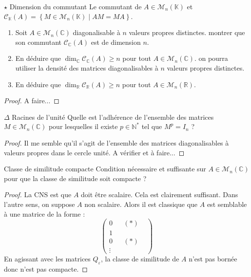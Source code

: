 \documentclass[french,a4paper]{article}
\newcommand{\N}{\mathbb{N}}
\newcommand{\R}{\mathbb{R}}
\newcommand{\C}{\mathbb{C}}
\newcommand{\K}{\mathbb{K}}
\newcommand{\st}{^*}
\theoremstyle{plain}
\theoremstyle{definition}
\theoremstyle{remark}
\begin{document}
\begin{ex}[Moulin.57]{$\star$ Dimension du commutant}
	Le commutant de $A\in\mathcal{M}_n(\K)$ et $\mathcal{C}_\K(A)=\left\{M\in\mathcal{M}_n(\K)\mid AM=MA\right\}$.
	\begin{enumerate}
		\item Soit $A\in\mathcal{M}_n(\C)$ diagonalisable à $n$ valeurs propres distinctes. montrer que son commutant $\mathcal{C}_\C(A)$ est de dimension $n$.
		\item En déduire que $\dim_\C\mathcal{C}_\C(A)\geqslant n$ pour tout $A\in\mathcal{M}_n(\C)$. on pourra utiliser la densité des matrices diagonalisables à $n$ valeurs propres distinctes.
		\item En déduire que $\dim_\R\mathcal{C}_\R(A)\geqslant n$ pour tout $A\in\mathcal{M}_n(\R)$.
	\end{enumerate}
\end{ex}
\begin{proof}
	A faire...
\end{proof}

\begin{ex}[Moulin.58]{$\Delta$ Racines de l'unité}
	Quelle est l'adhérence de l'ensemble des matrices $M\in\mathcal{M}_n(\C)$ pour lesquelles il existe $p\in\N\st$ tel que $M^p=I_n$ ?
\end{ex}
\begin{proof}
	Il me semble qu'il s'agit de l'ensemble des matrices diagonalisables à valeurs propres dans le cercle unité. A vérifier et à faire...
\end{proof}

\begin{ex}[Moulin.59]{Classe de similitude compacte}
	Condition nécessaire et suffisante sur $A\in\mathcal{M}_n(\C)$ pour que la classe de similitude soit compacte ?
\end{ex}
\begin{proof}
	La CNS est que $A$ doit être scalaire. Cela est clairement suffisant. Dans l'autre sens, on suppose $A$ non scalaire. Alors il est classique que $A$ est semblable à une matrice de la forme : $$\begin{pmatrix}
		0&&(*)&\\
		1&&&\\
		0&&(*)&\\
		\vdots&&&
	\end{pmatrix}$$ En agissant avec les matrices $Q_\varepsilon$, la classe de similitude de $A$ n'est pas bornée donc n'est pas compacte. 
\end{proof}
\end{document}
